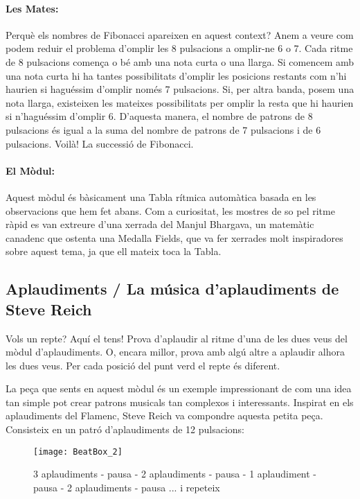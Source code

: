 \paragraph{Les Mates:}
Perquè els nombres de Fibonacci apareixen en aquest context? Anem a veure com podem reduir el problema d'omplir les 8 pulsacions a omplir-ne 6 o 7. Cada ritme de 8 pulsacions comença o bé amb una nota curta o una llarga.  Si comencem amb una nota curta hi ha tantes possibilitats d'omplir les posicions restants com n'hi haurien si haguéssim d'omplir només 7 pulsacions. Si, per altra banda, posem una nota llarga, existeixen les mateixes possibilitats per omplir la resta que hi haurien si n'haguéssim d'omplir 6. D'aquesta manera, el nombre de patrons de 8 pulsacions és igual a la suma del nombre de patrons de 7 pulsacions i de 6 pulsacions. Voilà! La successió de Fibonacci.

\paragraph{El Mòdul:} Aquest mòdul és bàsicament una Tabla rítmica automàtica basada en les observacions que hem fet abans. Com a curiositat, les mostres de so pel ritme ràpid es van extreure d'una xerrada del Manjul Bhargava, un matemàtic canadenc que ostenta una Medalla Fields, que va fer xerrades molt inspiradores sobre aquest tema, ja que ell mateix toca la Tabla.

\subsection{Aplaudiments  / La música d'aplaudiments de Steve Reich}
Vols un repte? Aquí el tens! Prova d'aplaudir al ritme d'una de les dues veus del mòdul d'aplaudiments. O, encara millor, prova amb algú altre a aplaudir alhora les dues veus. Per cada posició del punt verd el repte és diferent.

La peça que sents en aquest mòdul és un exemple impressionant de com una idea tan simple pot  crear patrons musicals tan complexos i interessants. Inspirat en els aplaudiments del Flamenc, Steve Reich va compondre aquesta petita peça. Consisteix en un patró d'aplaudiments de 12 pulsacions:


\begin{figure}[h]
\centering
\texttt{[image: BeatBox\_2]}
\caption*{3 aplaudiments - pausa - 2 aplaudiments - pausa - 1 aplaudiment - pausa - 2 aplaudiments  - pausa ... i repeteix}
\end{figure}



